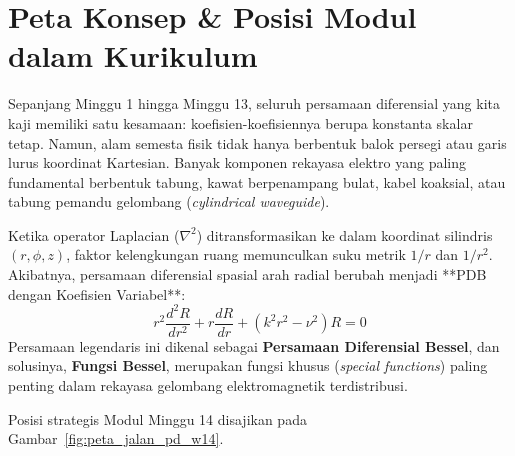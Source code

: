 \documentclass[11pt,a4paper]{article}
\theoremstyle{definition}
\begin{document}
\newpage

\section{Peta Konsep \& Posisi Modul dalam Kurikulum}

Sepanjang Minggu 1 hingga Minggu 13, seluruh persamaan diferensial yang kita kaji memiliki satu kesamaan: koefisien-koefisiennya berupa konstanta skalar tetap. Namun, alam semesta fisik tidak hanya berbentuk balok persegi atau garis lurus koordinat Kartesian. Banyak komponen rekayasa elektro yang paling fundamental berbentuk tabung, kawat berpenampang bulat, kabel koaksial, atau tabung pemandu gelombang (\textit{cylindrical waveguide}).

Ketika operator Laplacian ($\nabla^2$) ditransformasikan ke dalam koordinat silindris $(r, \phi, z)$, faktor kelengkungan ruang memunculkan suku metrik $1/r$ dan $1/r^2$. Akibatnya, persamaan diferensial spasial arah radial berubah menjadi **PDB dengan Koefisien Variabel**:
\begin{equation}
    r^2 \frac{d^2 R}{dr^2} + r \frac{dR}{dr} + (k^2 r^2 - \nu^2) R = 0
\end{equation}
Persamaan legendaris ini dikenal sebagai \textbf{Persamaan Diferensial Bessel}, dan solusinya, \textbf{Fungsi Bessel}, merupakan fungsi khusus (\textit{special functions}) paling penting dalam rekayasa gelombang elektromagnetik terdistribusi.

Posisi strategis Modul Minggu 14 disajikan pada Gambar~\ref{fig:peta_jalan_pd_w14}.
\end{document}
